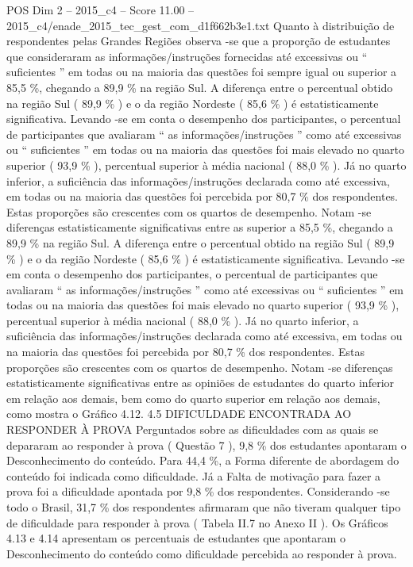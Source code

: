 \begin{textsample}{POS Dim 2 – 2015\_c4 – Score 11.00 – 2015\_c4/enade\_2015\_tec\_gest\_com\_d1f662b3e1.txt}
Quanto à distribuição de respondentes pelas Grandes Regiões observa -se que a proporção de estudantes que consideraram as informações/instruções fornecidas até excessivas ou “ suficientes ” em todas ou na maioria das questões foi sempre igual ou superior a 85,5 \%, chegando a 89,9 \% na região Sul.
A diferença entre o percentual obtido na região Sul ( 89,9 \% ) e o da região Nordeste ( 85,6 \% ) é estatisticamente significativa.
Levando -se em conta o desempenho dos participantes, o percentual de participantes que avaliaram “ as informações/instruções ” como até excessivas ou “ suficientes ” em todas ou na maioria das questões foi mais elevado no quarto superior ( 93,9 \% ), percentual superior à média nacional ( 88,0 \% ).
Já no quarto inferior, a suficiência das informações/instruções declarada como até excessiva, em todas ou na maioria das questões foi percebida por 80,7 \% dos respondentes.
Estas proporções são crescentes com os quartos de desempenho.
Notam -se diferenças estatisticamente significativas entre as superior a 85,5 \%, chegando a 89,9 \% na região Sul.
A diferença entre o percentual obtido na região Sul ( 89,9 \% ) e o da região Nordeste ( 85,6 \% ) é estatisticamente significativa.
Levando -se em conta o desempenho dos participantes, o percentual de participantes que avaliaram “ as informações/instruções ” como até excessivas ou “ suficientes ” em todas ou na maioria das questões foi mais elevado no quarto superior ( 93,9 \% ), percentual superior à média nacional ( 88,0 \% ).
Já no quarto inferior, a suficiência das informações/instruções declarada como até excessiva, em todas ou na maioria das questões foi percebida por 80,7 \% dos respondentes.
Estas proporções são crescentes com os quartos de desempenho.
Notam -se diferenças estatisticamente significativas entre as opiniões de estudantes do quarto inferior em relação aos demais, bem como do quarto superior em relação aos demais, como mostra o Gráfico 4.12. 4.5 DIFICULDADE ENCONTRADA AO RESPONDER À PROVA Perguntados sobre as dificuldades com as quais se depararam ao responder à prova ( Questão 7 ), 9,8 \% dos estudantes apontaram o Desconhecimento do conteúdo.
Para 44,4 \%, a Forma diferente de abordagem do conteúdo foi indicada como dificuldade.
Já a Falta de motivação para fazer a prova foi a dificuldade apontada por 9,8 \% dos respondentes.
Considerando -se todo o Brasil, 31,7 \% dos respondentes afirmaram que não tiveram qualquer tipo de dificuldade para responder à prova ( Tabela II.7 no Anexo II ).
Os Gráficos 4.13 e 4.14 apresentam os percentuais de estudantes que apontaram o Desconhecimento do conteúdo como dificuldade percebida ao responder à prova.

\end{textsample}
